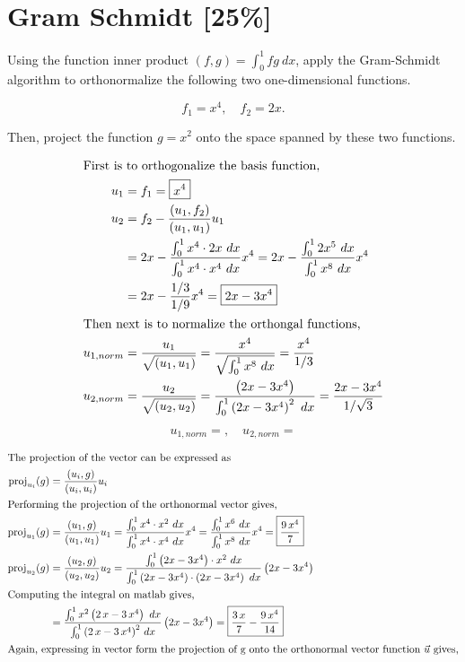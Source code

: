 \pagebreak
\section{Gram Schmidt [25\%]}
Using the function inner product $(f, g) =\int^1_0fg\ dx$, apply the Gram-Schmidt algorithm to orthonormalize the following two one-dimensional functions.

\begin{equation*}
    f_1 = x^4,\quad f_2 = 2x.
\end{equation*}

Then, project the function $g=x^2$ onto the space spanned by these two functions.

\vspace{-0.2in}
\begin{align*}
    \shortintertext{First is to orthogonalize the basis function,}
    u_1 & = f_1 = \boxed{x^4}\\
    u_2 & = f_2 - \frac{(u_1, f_2)}{(u_1, u_1)}u_1\\
        & = 2x - \frac{\int_0^1 x^4\cdot 2x\ dx}{\int_0^1 x^4\cdot x^4\ dx}x^4 = 2x - \frac{\int_0^1 2x^5\ dx}{\int_0^1 x^8\ dx}x^4\\ 
        & = 2x - \frac{1/3}{1/9}x^4 = \boxed{2x - 3x^4}\\
    \shortintertext{Then next is to normalize the orthongal functions,}
    u_{1, norm} & = \frac{u_1}{\sqrt{(u_1,u_1)}} = \frac{x^4}{\sqrt{\int_0^1 x^8\ dx}} = \frac{x^4}{1/3}\\
    u_{2, norm} & = \frac{u_2}{\sqrt{(u_2,u_2)}} = \frac{\left(2x - 3x^4\right)}{\int_0^1 \left(2x - 3x^4\right)^2\ dx} = \frac{2x-3x^4}{1/\sqrt{3}}
\end{align*}

\begin{equation*}
    \boxed{u_{1,norm} = ,\quad u_{2,norm} = }
\end{equation*}

\vspace{-0.35in}
\begin{align*}
    \shortintertext{The projection of the vector can be expressed as}
    \text{proj}_{u_i}(g) & = \frac{(u_i, g)}{(u_i, u_i)}u_i\\
    \shortintertext{Performing the projection of the orthonormal vector gives,}
    \text{proj}_{u_1}(g) & = \frac{(u_1, g)}{(u_1, u_1)}u_1  = \frac{\int_0^1 x^4\cdot x^2\ dx}{ \int_0^1 x^4\cdot x^4\ dx}x^4  = \frac{\int_0^1 x^6\ dx}{\int_0^1 x^8\ dx}x^4 = \boxed{\frac{9\,x^4}{7}}\\
    \text{proj}_{u_2}(g) & = \frac{(u_2, g)}{(u_2, u_2)}u_2 = \frac{\int_0^1 \left(2x - 3x^4\right)\cdot x^2\ dx}{ \int_0^1 \left(2x - 3x^4\right)\cdot \left(2x - 3x^4\right)\ dx}\left(2x - 3x^4\right)\\
    \shortintertext{Computing the integral on matlab gives,}
        & = \frac{\int_0^1 x^2 \left(2\,x-3\,x^4\right)\ dx}{\int_0^1 {\left(2\,x-3\,x^4\right)}^2\ dx}\left(2x - 3x^4\right) = \boxed{\frac{3\,x}{7}-\frac{9\,x^4}{14}}\\
    \shortintertext{Again, expressing in vector form the projection of g onto the orthonormal vector function $\vec{u}$ gives,}
\end{align*}

